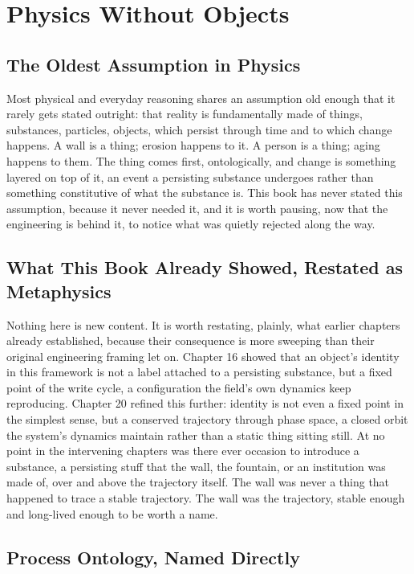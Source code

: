 \chapter{Physics Without Objects}

\section{The Oldest Assumption in Physics}

Most physical and everyday reasoning shares an assumption old enough that it rarely gets stated outright: that reality is fundamentally made of things, substances, particles, objects, which persist through time and to which change happens. A wall is a thing; erosion happens to it. A person is a thing; aging happens to them. The thing comes first, ontologically, and change is something layered on top of it, an event a persisting substance undergoes rather than something constitutive of what the substance is. This book has never stated this assumption, because it never needed it, and it is worth pausing, now that the engineering is behind it, to notice what was quietly rejected along the way.

\section{What This Book Already Showed, Restated as Metaphysics}

Nothing here is new content. It is worth restating, plainly, what earlier chapters already established, because their consequence is more sweeping than their original engineering framing let on. Chapter 16 showed that an object's identity in this framework is not a label attached to a persisting substance, but a fixed point of the write cycle, a configuration the field's own dynamics keep reproducing. Chapter 20 refined this further: identity is not even a fixed point in the simplest sense, but a conserved trajectory through phase space, a closed orbit the system's dynamics maintain rather than a static thing sitting still. At no point in the intervening chapters was there ever occasion to introduce a substance, a persisting stuff that the wall, the fountain, or an institution was made of, over and above the trajectory itself. The wall was never a thing that happened to trace a stable trajectory. The wall was the trajectory, stable enough and long-lived enough to be worth a name.

\section{Process Ontology, Named Directly}

